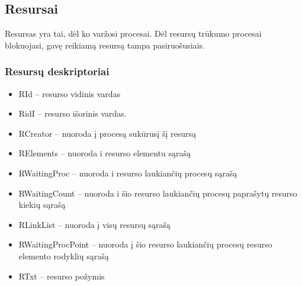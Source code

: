 \subsection{Resursai}
Resursas yra tai, dėl ko varžosi procesai. Dėl resursų trūkumo procesai blokuojasi, gavę reikiamą resursą tampa pasiruošusiais. 

\subsubsection{Resursų deskriptoriai}
\begin{itemize}
	\item RId  – resurso vidinis vardas
	\item RidI – resurso išorinis vardas.
	\item RCreator – nuoroda į procesą sukūrusį šį resursą
	\item RElements – nuoroda i resurso elementu sąrašą
	\item RWaitingProc – nuoroda i resurso laukiančių procesų sąrašą
	\item RWaitingCount – nuoroda i šio resurso laukiančių procesų paprašytų resurso kiekių sąrašą
	\item RLinkList – nuoroda į visų resursų sąrašą
	\item RWaitingProcPoint – nuoroda į šio resurso laukiančių procesų resurso elemento rodyklių sąrašą
	\item RTxt – resurso požymis
\end{itemize}

